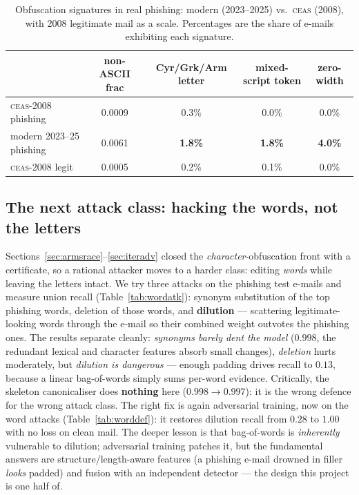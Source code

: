 \documentclass[11pt]{article}
\begin{document}
\begin{table}[t]
\centering
\caption{Obfuscation signatures in real phishing: modern (2023--2025) vs.\ \textsc{ceas}
(2008), with 2008 legitimate mail as a scale. Percentages are the share of e-mails
exhibiting each signature.}
\label{tab:realobf}
\begin{tabular}{lcccc}
\toprule
 & non-ASCII frac & Cyr/Grk/Arm letter & mixed-script token & zero-width \\
\midrule
\textsc{ceas}-2008 phishing     & 0.0009 & 0.3\% & 0.0\% & 0.0\% \\
modern 2023--25 phishing        & 0.0061 & \textbf{1.8\%} & \textbf{1.8\%} & \textbf{4.0\%} \\
\textsc{ceas}-2008 legit        & 0.0005 & 0.2\% & 0.1\% & 0.0\% \\
\bottomrule
\end{tabular}
\end{table}

\subsection{The next attack class: hacking the words, not the letters}
\label{sec:wordattack}
Sections~\ref{sec:armsrace}--\ref{sec:iteradv} closed the \emph{character}-obfuscation front
with a certificate, so a rational attacker moves to a harder class: editing \emph{words} while
leaving the letters intact. We try three attacks on the phishing test e-mails and measure union
recall (Table~\ref{tab:wordatk}): synonym substitution of the top phishing words, deletion of
those words, and \textbf{dilution} --- scattering legitimate-looking words through the e-mail so
their combined weight outvotes the phishing ones. The results separate cleanly:
\emph{synonyms barely dent the model} ($0.998$, the redundant lexical and character features
absorb small changes), \emph{deletion} hurts moderately, but \emph{dilution is dangerous} ---
enough padding drives recall to $0.13$, because a linear bag-of-words simply sums per-word
evidence. Critically, the skeleton canonicaliser does \textbf{nothing} here ($0.998\to0.997$):
it is the wrong defence for the wrong attack class. The right fix is again adversarial training,
now on the word attacks (Table~\ref{tab:worddef}): it restores dilution recall from $0.28$ to
$1.00$ with no loss on clean mail. The deeper lesson is that bag-of-words is \emph{inherently}
vulnerable to dilution; adversarial training patches it, but the fundamental answers are
structure/length-aware features (a phishing e-mail drowned in filler \emph{looks} padded) and
fusion with an independent detector --- the design this project is one half of.
\end{document}

